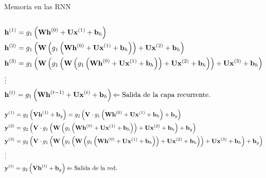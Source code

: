 \documentclass[aspectratio=169]{beamer}
\begin{document}
\begin{frame}[shrink=25]{Memoria en las RNN}
	\begin{columns}
		\begin{column}{0.6\textwidth}
			{\color{darkred}
			\begin{equation*}
				\begin{aligned}
					& \mathbf{h}^{(1)}=g_{1}\left(\mathbf{W h}^{(0)}+\mathbf{U} \mathbf{x}^{(1)}+\mathbf{b}_{h}\right) \\
					& \mathbf{h}^{(2)}=g_{1}\left(\mathbf{W}\left(g_{1}\left(\mathbf{W} \mathbf{h}^{(0)}+\mathbf{U} \mathbf{x}^{(1)}+\mathbf{b}_{h}\right)\right)+\mathbf{U} \mathbf{x}^{(2)}+\mathbf{b}_{h}\right) \\
					& \mathbf{h}^{(3)}=g_{1}\left(\mathbf{W}\left(g_{1}\left(\mathbf{W}\left(g_{1}\left(\mathbf{W h}^{(0)}+\mathbf{U} \mathbf{x}^{(1)}+\mathbf{b}_{h}\right)\right)+\mathbf{U} \mathbf{x}^{(2)}+\mathbf{b}_{h}\right)\right)+\mathbf{U} \mathbf{x}^{(3)}+\mathbf{b}_{h}\right) \\
					& \vdots \\
					& \mathbf{h}^{(t)}=g_{1}\left(\mathbf{W h}^{(t-1)}+\mathbf{U} \mathbf{x}^{(t)}+\mathbf{b}_{h}\right) {\color{black} \Leftarrow \text{Salida de la capa recurrente.}}\\
				\end{aligned}
			\end{equation*}}

			{\color{darkgreen}
			\begin{equation*}
				\begin{aligned}
					& \mathbf{y}^{(1)}=g_{2}\left(\mathbf{V h}^{(1)}+\mathbf{b}_{y}\right)=g_{2}\left(\mathbf{V} \cdot g_{1}\left(\mathbf{W h}^{(0)}+\mathbf{U} \mathbf{x}^{(1)}+\mathbf{b}_{h}\right)+\mathbf{b}_{y}\right) \\
					& \mathbf{y}^{(2)}=g_{2}\left(\mathbf{V} \cdot g_{1}\left(\mathbf{W}\left(g_{1}\left(\mathbf{W} \mathbf{h}^{(0)}+\mathbf{U} \mathbf{x}^{(1)}+\mathbf{b}_{h}\right)\right)+\mathbf{U} \mathbf{x}^{(2)}+\mathbf{b}_{h}\right)+\mathbf{b}_{y}\right) \\
					& \mathbf{y}^{(3)}=g_{2}\left(\mathbf{V} \cdot g_{1}\left(\mathbf{W}\left(g_{1}\left(\mathbf{W}\left(g_{1}\left(\mathbf{W h}^{(0)}+\mathbf{U} \mathbf{x}^{(1)}+\mathbf{b}_{h}\right)\right)+\mathbf{U} \mathbf{x}^{(2)}+\mathbf{b}_{h}\right)\right)+\mathbf{U} \mathbf{x}^{(3)}+\mathbf{b}_{h}\right)+\mathbf{b}_{y}\right) \\
					& \vdots \\	
					& \mathbf{y}^{(t)}=g_{2}\left(\mathbf{V h}^{(t)}+\mathbf{b}_{y}\right) {\color{black} \Leftarrow \text{Salida de la red.}}
				\end{aligned}
			\end{equation*}}
		

\end{column}
\end{columns}
\end{frame}
\end{document}
